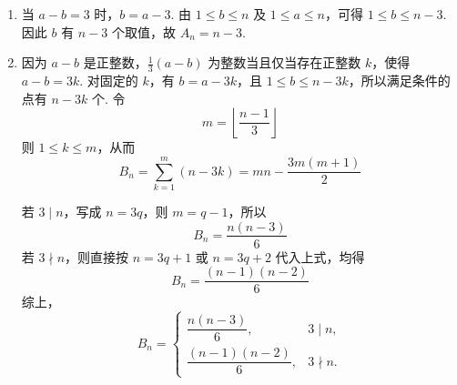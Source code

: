 \begin{solution}
\begin{enumerate}
\item 当 \(a-b=3\) 时，\(b=a-3\). 由 \(1\leqslant b\leqslant n\) 及 \(1\leqslant a\leqslant n\)，可得 \(1\leqslant b\leqslant n-3\). 因此 \(b\) 有 \(n-3\) 个取值，故 \(A_n=n-3\).

\item 因为 \(a-b\) 是正整数，\(\frac{1}{3}(a-b)\) 为整数当且仅当存在正整数 \(k\)，使得 \(a-b=3k\). 对固定的 \(k\)，有 \(b=a-3k\)，且 \(1\leqslant b\leqslant n-3k\)，所以满足条件的点有 \(n-3k\) 个. 令
\[
m=\left\lfloor\frac{n-1}{3}\right\rfloor
\]
则 \(1\leqslant k\leqslant m\)，从而
\[
B_n=\sum_{k=1}^{m}(n-3k)=mn-\frac{3m(m+1)}{2}
\]

若 \(3\mid n\)，写成 \(n=3q\)，则 \(m=q-1\)，所以
\[
B_n=\frac{n(n-3)}{6}
\]
若 \(3\nmid n\)，则直接按 \(n=3q+1\) 或 \(n=3q+2\) 代入上式，均得
\[
B_n=\frac{(n-1)(n-2)}{6}
\]
综上，
\[
B_n=\begin{cases}
\dfrac{n(n-3)}{6},&3\mid n,\\
\dfrac{(n-1)(n-2)}{6},&3\nmid n.
\end{cases}
\]
\end{enumerate}
\end{solution}
